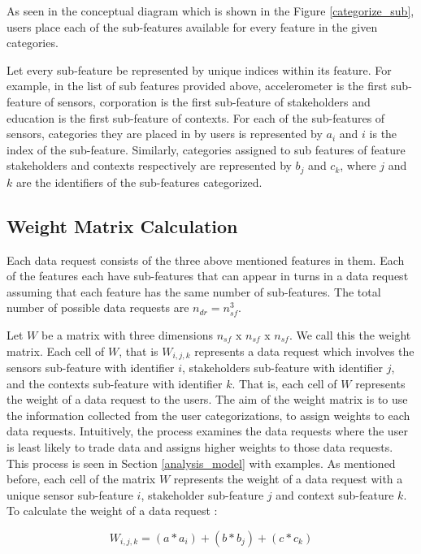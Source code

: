 As seen in the conceptual diagram which is shown in the Figure \ref{categorize_sub}, users place each of the sub-features available for every feature in the given categories.

Let every sub-feature be represented by unique indices within its feature. For example, in the list of sub features provided above, accelerometer is the first sub-feature of sensors, corporation is the first sub-feature of stakeholders and education is the first sub-feature of contexts. For each of the sub-features of sensors, categories they are placed in by users is represented by $a_{i}$ and $i$ is the index
of the sub-feature. Similarly, categories assigned to sub features of feature stakeholders and contexts respectively are represented by $b_{j}$ and $c_{k}$, where $j$ and $k$ are the identifiers of the sub-features categorized.

\subsection{Weight Matrix Calculation}
Each data request consists of the three above mentioned features in them. Each of the features each have \numsubfeatures sub-features that can appear in turns in a data request assuming that each feature has the same number of sub-features. The total number of possible data requests are $n_{dr} =  n_{sf}^3$.

Let $W$  be a matrix with three dimensions $n_{sf}$ x $n_{sf}$ x $n_{sf}$. We call this the weight matrix.
Each cell of $W$, that is $W_{i,j,k}$ represents a data request which involves the sensors sub-feature with identifier $i$, stakeholders sub-feature with identifier $j$,
and the contexts sub-feature with identifier $k$. That is, each cell of $W$ represents the weight of a data request to the users. The aim of the weight matrix is to use the information collected from the user categorizations, to assign weights to each data requests. Intuitively, the process examines the
data requests where the user is least likely to trade data and assigns higher weights to those data requests. This process is seen in
Section \ref{analysis_model} with examples. As mentioned before, each cell of the matrix $W$ represents the weight of a data request with a unique sensor sub-feature $i$, stakeholder sub-feature $j$ and context sub-feature $k$. To calculate the weight of a data request :

\begin{equation}
W_{i,j,k} = (a*a_{i}) + (b*b_{j}) + (c*c_{k})
\end{equation}

